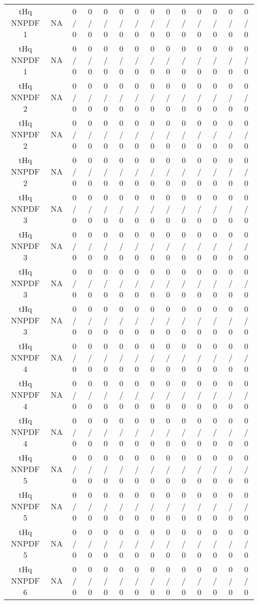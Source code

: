 \documentclass[10pt]{article}
\begin{document}
\begin{table}[htbp]
\begin{center}
\begin{tabular}{|c|c|c|c|c|c|c|c|c|c|c|c|c|c|}
  tHq NNPDF 1 &    NA    & 0 / 0 & 0 / 0 & 0 / 0 & 0 / 0 & 0 / 0 & 0 / 0 & 0 / 0 & 0 / 0 & 0 / 0 & 0 / 0 & 0 / 0 & 0 / 0 \\ 
  tHq NNPDF 1 &    NA    & 0 / 0 & 0 / 0 & 0 / 0 & 0 / 0 & 0 / 0 & 0 / 0 & 0 / 0 & 0 / 0 & 0 / 0 & 0 / 0 & 0 / 0 & 0 / 0 \\ 
  tHq NNPDF 2 &    NA    & 0 / 0 & 0 / 0 & 0 / 0 & 0 / 0 & 0 / 0 & 0 / 0 & 0 / 0 & 0 / 0 & 0 / 0 & 0 / 0 & 0 / 0 & 0 / 0 \\ 
  tHq NNPDF 2 &    NA    & 0 / 0 & 0 / 0 & 0 / 0 & 0 / 0 & 0 / 0 & 0 / 0 & 0 / 0 & 0 / 0 & 0 / 0 & 0 / 0 & 0 / 0 & 0 / 0 \\ 
  tHq NNPDF 2 &    NA    & 0 / 0 & 0 / 0 & 0 / 0 & 0 / 0 & 0 / 0 & 0 / 0 & 0 / 0 & 0 / 0 & 0 / 0 & 0 / 0 & 0 / 0 & 0 / 0 \\ 
  tHq NNPDF 3 &    NA    & 0 / 0 & 0 / 0 & 0 / 0 & 0 / 0 & 0 / 0 & 0 / 0 & 0 / 0 & 0 / 0 & 0 / 0 & 0 / 0 & 0 / 0 & 0 / 0 \\ 
  tHq NNPDF 3 &    NA    & 0 / 0 & 0 / 0 & 0 / 0 & 0 / 0 & 0 / 0 & 0 / 0 & 0 / 0 & 0 / 0 & 0 / 0 & 0 / 0 & 0 / 0 & 0 / 0 \\ 
  tHq NNPDF 3 &    NA    & 0 / 0 & 0 / 0 & 0 / 0 & 0 / 0 & 0 / 0 & 0 / 0 & 0 / 0 & 0 / 0 & 0 / 0 & 0 / 0 & 0 / 0 & 0 / 0 \\ 
  tHq NNPDF 3 &    NA    & 0 / 0 & 0 / 0 & 0 / 0 & 0 / 0 & 0 / 0 & 0 / 0 & 0 / 0 & 0 / 0 & 0 / 0 & 0 / 0 & 0 / 0 & 0 / 0 \\ 
  tHq NNPDF 4 &    NA    & 0 / 0 & 0 / 0 & 0 / 0 & 0 / 0 & 0 / 0 & 0 / 0 & 0 / 0 & 0 / 0 & 0 / 0 & 0 / 0 & 0 / 0 & 0 / 0 \\ 
  tHq NNPDF 4 &    NA    & 0 / 0 & 0 / 0 & 0 / 0 & 0 / 0 & 0 / 0 & 0 / 0 & 0 / 0 & 0 / 0 & 0 / 0 & 0 / 0 & 0 / 0 & 0 / 0 \\ 
  tHq NNPDF 4 &    NA    & 0 / 0 & 0 / 0 & 0 / 0 & 0 / 0 & 0 / 0 & 0 / 0 & 0 / 0 & 0 / 0 & 0 / 0 & 0 / 0 & 0 / 0 & 0 / 0 \\ 
  tHq NNPDF 5 &    NA    & 0 / 0 & 0 / 0 & 0 / 0 & 0 / 0 & 0 / 0 & 0 / 0 & 0 / 0 & 0 / 0 & 0 / 0 & 0 / 0 & 0 / 0 & 0 / 0 \\ 
  tHq NNPDF 5 &    NA    & 0 / 0 & 0 / 0 & 0 / 0 & 0 / 0 & 0 / 0 & 0 / 0 & 0 / 0 & 0 / 0 & 0 / 0 & 0 / 0 & 0 / 0 & 0 / 0 \\ 
  tHq NNPDF 5 &    NA    & 0 / 0 & 0 / 0 & 0 / 0 & 0 / 0 & 0 / 0 & 0 / 0 & 0 / 0 & 0 / 0 & 0 / 0 & 0 / 0 & 0 / 0 & 0 / 0 \\ 
  tHq NNPDF 6 &    NA    & 0 / 0 & 0 / 0 & 0 / 0 & 0 / 0 & 0 / 0 & 0 / 0 & 0 / 0 & 0 / 0 & 0 / 0 & 0 / 0 & 0 / 0 & 0 / 0 \\ 

\end{tabular}
\end{center}
\end{table}
\end{document}
